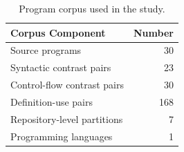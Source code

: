 \begin{table}[t]
\centering
\caption{Program corpus used in the study.}
\label{tab:corpus}
\begin{tabular}{lr}
\toprule
Corpus Component & Number \\
\midrule
Source programs & 30 \\
Syntactic contrast pairs & 23 \\
Control-flow contrast pairs & 30 \\
Definition-use pairs & 168 \\
Repository-level partitions & 7 \\
Programming languages & 1 \\
\bottomrule
\end{tabular}
\end{table}
